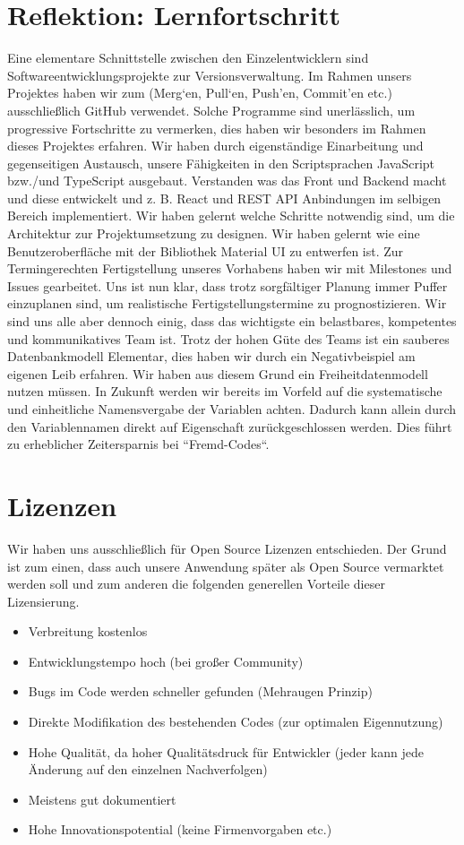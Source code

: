 \section{Reflektion: Lernfortschritt}
Eine elementare Schnittstelle zwischen den Einzelentwicklern sind Softwareentwicklungsprojekte zur Versionsverwaltung. 
Im Rahmen unsers Projektes haben wir zum (Merg‘en, Pull‘en, Push’en, Commit’en etc.) ausschließlich GitHub verwendet. 
Solche Programme sind unerlässlich, um progressive Fortschritte zu vermerken, dies haben wir besonders im Rahmen dieses Projektes erfahren. 
Wir haben durch eigenständige Einarbeitung und gegenseitigen Austausch, unsere Fähigkeiten in den Scriptsprachen JavaScript bzw./und TypeScript ausgebaut. 
Verstanden was das Front und Backend macht und diese entwickelt und z. B. React und REST API Anbindungen im selbigen Bereich implementiert. 
Wir haben gelernt welche Schritte notwendig sind, um die Architektur zur Projektumsetzung zu designen.
Wir haben gelernt wie eine Benutzeroberfläche mit der Bibliothek Material UI zu entwerfen ist. 
Zur Termingerechten Fertigstellung unseres Vorhabens haben wir mit Milestones und Issues gearbeitet. 
Uns ist nun klar, dass trotz sorgfältiger Planung immer Puffer einzuplanen sind, um realistische Fertigstellungstermine zu prognostizieren. 
Wir sind uns alle aber dennoch einig, dass das wichtigste ein belastbares, kompetentes und kommunikatives Team ist. 
Trotz der hohen Güte des Teams ist ein sauberes Datenbankmodell Elementar, dies haben wir durch ein Negativbeispiel am eigenen Leib erfahren.
Wir haben aus diesem Grund ein Freiheitdatenmodell nutzen müssen. 
In Zukunft werden wir bereits im Vorfeld auf die systematische und einheitliche Namensvergabe der Variablen achten. 
Dadurch kann allein durch den Variablennamen direkt auf Eigenschaft zurückgeschlossen werden.
Dies führt zu erheblicher Zeitersparnis bei “Fremd-Codes“.


\section{Lizenzen}
Wir haben uns ausschließlich für Open Source Lizenzen entschieden. 
Der Grund ist zum einen, dass auch unsere Anwendung später als Open Source vermarktet werden soll und zum anderen die folgenden generellen Vorteile dieser Lizensierung.

\begin{itemize}
    \item	Verbreitung kostenlos
    \item   Entwicklungstempo hoch (bei großer Community)
    \item   Bugs im Code werden schneller gefunden (Mehraugen Prinzip)
    \item	Direkte Modifikation des bestehenden Codes (zur optimalen Eigennutzung)
    \item	Hohe Qualität, da hoher Qualitätsdruck für Entwickler (jeder kann jede Änderung auf den einzelnen Nachverfolgen)
    \item	Meistens gut dokumentiert
    \item	Hohe Innovationspotential (keine Firmenvorgaben etc.)
\end{itemize}


